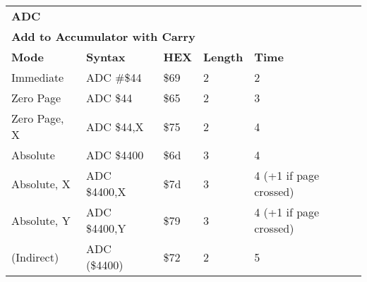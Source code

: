 


\begin{table}[H]
\begin{tabular}{p{}p{}p{}p{}p{}}
\multicolumn{5}{p{0.22\textwidth}}{\huge\textbf{ADC}}\\
\multicolumn{5}{p{0.9\textwidth}}{\textbf{Add to Accumulator with Carry}}\\ \hline
\multicolumn{1}{|p{0.22\textwidth}|}{\textbf{Mode}}&\multicolumn{1}{|p{0.2\textwidth}|}{\textbf{Syntax}}&\multicolumn{1}{|p{0.1\textwidth}|}{\textbf{HEX}}&\multicolumn{1}{|p{0.1\textwidth}|}{\textbf{Length}}&\multicolumn{1}{|p{0.4\textwidth}|}{\textbf{Time}}\\ \hline
\multicolumn{1}{|p{0.22\textwidth}|}{Immediate}&\multicolumn{1}{|p{0.2\textwidth}|}{ADC \#\$44}&\multicolumn{1}{|p{0.1\textwidth}|}{\$69}&\multicolumn{1}{|p{0.1\textwidth}|}{2}&\multicolumn{1}{|p{0.4\textwidth}|}{2}\\ \hline
\multicolumn{1}{|p{0.22\textwidth}|}{Zero Page}&\multicolumn{1}{|p{0.2\textwidth}|}{ADC \$44}&\multicolumn{1}{|p{0.1\textwidth}|}{\$65}&\multicolumn{1}{|p{0.1\textwidth}|}{2}&\multicolumn{1}{|p{0.4\textwidth}|}{3}\\ \hline
\multicolumn{1}{|p{0.22\textwidth}|}{Zero Page, X}&\multicolumn{1}{|p{0.2\textwidth}|}{ADC \$44,X}&\multicolumn{1}{|p{0.1\textwidth}|}{\$75}&\multicolumn{1}{|p{0.1\textwidth}|}{2}&\multicolumn{1}{|p{0.4\textwidth}|}{4}\\ \hline
\multicolumn{1}{|p{0.22\textwidth}|}{Absolute}&\multicolumn{1}{|p{0.2\textwidth}|}{ADC \$4400}&\multicolumn{1}{|p{0.1\textwidth}|}{\$6d}&\multicolumn{1}{|p{0.1\textwidth}|}{3}&\multicolumn{1}{|p{0.4\textwidth}|}{4}\\ \hline
\multicolumn{1}{|p{0.22\textwidth}|}{Absolute, X}&\multicolumn{1}{|p{0.2\textwidth}|}{ADC \$4400,X}&\multicolumn{1}{|p{0.1\textwidth}|}{\$7d}&\multicolumn{1}{|p{0.1\textwidth}|}{3}&\multicolumn{1}{|p{0.4\textwidth}|}{4 (+1 if page crossed)}\\ \hline
\multicolumn{1}{|p{0.22\textwidth}|}{Absolute, Y}&\multicolumn{1}{|p{0.2\textwidth}|}{ADC \$4400,Y}&\multicolumn{1}{|p{0.1\textwidth}|}{\$79}&\multicolumn{1}{|p{0.1\textwidth}|}{3}&\multicolumn{1}{|p{0.4\textwidth}|}{4 (+1 if page crossed)}\\ \hline
\multicolumn{1}{|p{0.22\textwidth}|}{(Indirect)}&\multicolumn{1}{|p{0.2\textwidth}|}{ADC (\$4400)}&\multicolumn{1}{|p{0.1\textwidth}|}{\$72}&\multicolumn{1}{|p{0.1\textwidth}|}{2}&\multicolumn{1}{|p{0.4\textwidth}|}{5}\\ \hline

\end{tabular}
\end{table}
